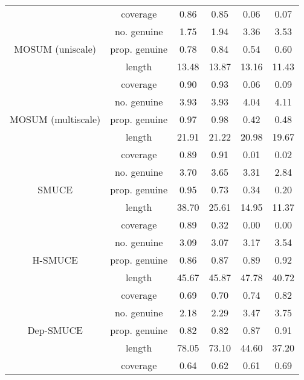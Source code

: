 \begin{tabular}{|c|c|c|c|c|c|}
   & coverage & 0.86 & 0.85 & 0.06 & 0.07 \\ 
   & no. genuine & 1.75 & 1.94 & 3.36 & 3.53 \\ 
  MOSUM (uniscale) & prop. genuine & 0.78 & 0.84 & 0.54 & 0.60 \\ 
   & length & 13.48 & 13.87 & 13.16 & 11.43 \\ 
   & coverage & 0.90 & 0.93 & 0.06 & 0.09 \\ 
   & no. genuine & 3.93 & 3.93 & 4.04 & 4.11 \\ 
  MOSUM (multiscale) & prop. genuine & 0.97 & 0.98 & 0.42 & 0.48 \\ 
   & length & 21.91 & 21.22 & 20.98 & 19.67 \\ 
   & coverage & 0.89 & 0.91 & 0.01 & 0.02 \\ 
   & no. genuine & 3.70 & 3.65 & 3.31 & 2.84 \\ 
  SMUCE & prop. genuine & 0.95 & 0.73 & 0.34 & 0.20 \\ 
   & length & 38.70 & 25.61 & 14.95 & 11.37 \\ 
   & coverage & 0.89 & 0.32 & 0.00 & 0.00 \\ 
   & no. genuine & 3.09 & 3.07 & 3.17 & 3.54 \\ 
  H-SMUCE & prop. genuine & 0.86 & 0.87 & 0.89 & 0.92 \\ 
   & length & 45.67 & 45.87 & 47.78 & 40.72 \\ 
   & coverage & 0.69 & 0.70 & 0.74 & 0.82 \\ 
   & no. genuine & 2.18 & 2.29 & 3.47 & 3.75 \\ 
  Dep-SMUCE & prop. genuine & 0.82 & 0.82 & 0.87 & 0.91 \\ 
   & length & 78.05 & 73.10 & 44.60 & 37.20 \\ 
   & coverage & 0.64 & 0.62 & 0.61 & 0.69 \\ 
   \hline
\end{tabular}
